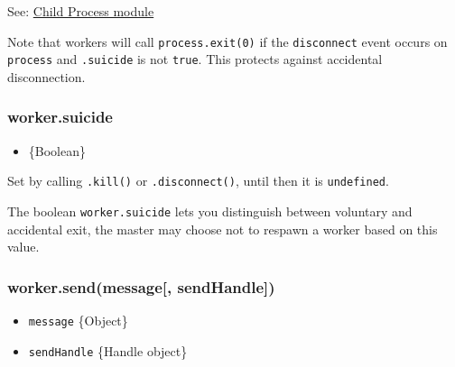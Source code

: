 See:
\href{child_process.html\#child_process_child_process_fork_modulepath_args_options}{Child
Process module}

Note that workers will call \texttt{process.exit(0)} if the
\texttt{\textquotesingle{}disconnect\textquotesingle{}} event occurs on
\texttt{process} and \texttt{.suicide} is not \texttt{true}. This
protects against accidental disconnection.

\subsubsection{worker.suicide}\label{worker.suicide}

\begin{itemize}
\itemsep1pt\parskip0pt
\item
  \{Boolean\}
\end{itemize}

Set by calling \texttt{.kill()} or \texttt{.disconnect()}, until then it
is \texttt{undefined}.

The boolean \texttt{worker.suicide} lets you distinguish between
voluntary and accidental exit, the master may choose not to respawn a
worker based on this value.

\begin{Shaded}
\begin{Highlighting}[]
\NormalTok{(}\NormalTok{, }
   \NormalTok{(} \NormalTok{=== }\NormalTok{) \{}
    \NormalTok{(}
  \NormalTok{\}}
\NormalTok{\});}

\NormalTok{();}
\end{Highlighting}
\end{Shaded}

\subsubsection{worker.send(message{[},
sendHandle{]})}\label{worker.sendmessage-sendhandle}

\begin{itemize}
\itemsep1pt\parskip0pt
\item
  \texttt{message} \{Object\}
\item
  \texttt{sendHandle} \{Handle object\}
\end{itemize}

